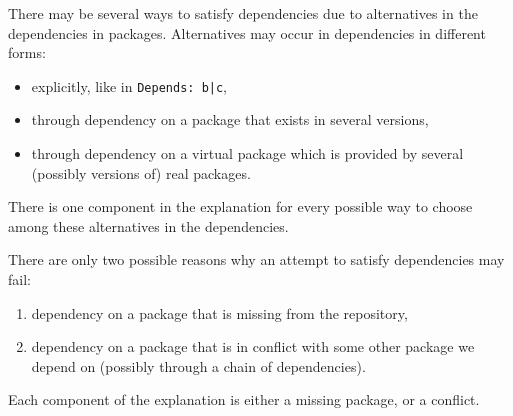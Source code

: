 There may be several ways to satisfy dependencies due to alternatives
in the dependencies in packages. Alternatives may occur in dependencies
in different forms:
\begin{itemize}
\item explicitly, like in \texttt{Depends: b|c},
\item through dependency on a package that exists in several versions,
\item through dependency on a virtual package which is provided by several
  (possibly versions of) real packages.
\end{itemize}
There is one component in the explanation for every possible way to
choose among these alternatives in the dependencies.

There are only two possible reasons why an attempt to satisfy dependencies
may fail:
\begin{enumerate}
\item dependency on a package that is missing from the repository,
\item dependency on a package that is in conflict with some other package
  we depend on (possibly through a chain of dependencies).
\end{enumerate}
Each component of the explanation is either a missing package, or a conflict. 

